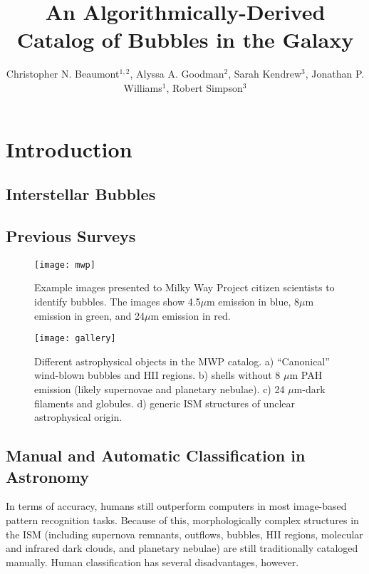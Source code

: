 \documentclass[preprint]{aastex}
\begin{document}
\title{An Algorithmically-Derived Catalog of Bubbles in the Galaxy}
\author{Christopher N. Beaumont$^{1,2}$, Alyssa A. Goodman$^2$, Sarah Kendrew$^3$, Jonathan P. Williams$^1$, Robert Simpson$^3$}


\section{Introduction}
\label{sec:intro}

\subsection{Interstellar Bubbles}
\label{sec:bubbles}

\subsection{Previous Surveys}
\label{sec:previous_surveys}

\begin{figure}
\texttt{[image: mwp]}
\caption{Example images presented to Milky Way Project citizen scientists to identify bubbles. The images show 4.5$\mu$m emission in blue, 
8$\mu$m emission in green, and 24$\mu$m emission in red.}
\end{figure}

\begin{figure*}
\texttt{[image: gallery]}
\caption{Different astrophysical objects in the MWP catalog. a) ``Canonical'' wind-blown bubbles and HII regions. b) shells
without 8 $\mu$m PAH emission (likely supernovae and planetary nebulae). c) 24 $\mu$m-dark filaments and globules. d) generic
ISM structures of unclear astrophysical origin.}
\label{fig:gallery}
\end{figure*}

\subsection{Manual and Automatic Classification in Astronomy}
\label{sec:benefits}

In terms of accuracy, humans still outperform computers in most image-based pattern recognition tasks. Because of this, morphologically complex
structures in the ISM (including supernova remnants, outflows, bubbles, HII regions, molecular and infrared dark clouds, and planetary nebulae) are still
traditionally cataloged manually. Human classification has several disadvantages, however.
\end{document}
